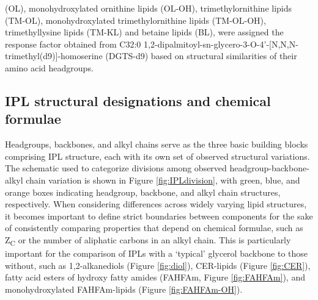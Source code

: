 (OL), monohydroxylated ornithine lipids (OL-OH), trimethylornithine lipids (TM-OL), monohydroxylated trimethylornithine lipids (TM-OL-OH), trimethyllysine lipids (TM-KL) and betaine lipids (BL), were assigned the response factor obtained from C32:0 1,2-dipalmitoyl-sn-glycero-3-O-4'-[N,N,N-trimethyl(d9)]-homoserine (DGTS-d9) based on structural similarities of their amino acid headgroups.




\subsection{IPL structural designations and chemical formulae} Headgroups, backbones, and alkyl chains serve as the three basic building blocks comprising IPL structure, each with its own set of observed structural variations. The schematic used to categorize divisions among observed headgroup-backbone-alkyl chain variation is shown in Figure \ref{fig:IPLdivision}, with green, blue, and orange boxes indicating headgroup, backbone, and alkyl chain structures, respectively. When considering differences across widely varying lipid structures, it becomes important to define strict boundaries between components for the sake of consistently comparing properties that depend on chemical formulae, such as Z\textsubscript{C} or the number of aliphatic carbons in an alkyl chain. This is particularly important for the comparison of IPLs with a `typical' glycerol backbone to those without, such as 1,2-alkanediols (Figure \ref{fig:diol}), CER-lipids (Figure \ref{fig:CER}), fatty acid esters of hydroxy fatty amides (FAHFAm, Figure \ref{fig:FAHFAm}), and monohydroxylated FAHFAm-lipids (Figure \ref{fig:FAHFAm-OH}).


